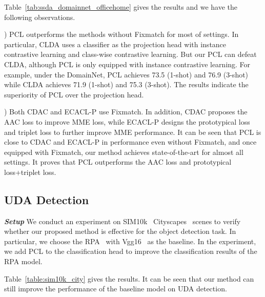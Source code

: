 Table~\ref{tab:ssda_domainnet_officehome} gives the results and we have the following observations.

) PCL outperforms the methods without Fixmatch for most of settings. In particular, CLDA uses a classifier as the projection head with instance contrastive learning and class-wise contrastive learning. But our PCL can defeat CLDA, although PCL is only equipped with instance contrastive learning. For example, under the DomainNet, PCL achieves 73.5 (1-shot) and 76.9 (3-shot) while CLDA achieves 71.9 (1-shot) and 75.3 (3-shot). The results indicate the superiority of PCL over the projection head.

) Both CDAC and ECACL-P use Fixmatch. In addition, CDAC proposes the AAC loss to improve MME loss, while ECACL-P designs the prototypical loss and triplet loss to further improve MME performance. It can be seen that PCL is close to CDAC and ECACL-P in performance even without Fixmatch, and once equipped with Fixmatch, our method achieves state-of-the-art for almost all settings. It proves that PCL outperforms the AAC loss and prototypical loss+triplet loss.


\subsection{UDA  Detection}
\label{app:DAOD}
\noindent\textbf{\textit{Setup}} We conduct an experiment on SIM10k~\cite{SIM10K}  Cityscapes~\cite{cordts2016cityscapes} scenes to verify whether our proposed method is effective for the object detection task.
In particular, we choose the RPA~\cite{zhang2021rpn} with Vgg16~\cite{simonyan2014very} as the baseline. In the experiment, we add PCL to the classification head to improve the classification results of the RPA model. 

Table~\ref{table:sim10k_city} gives the results. It can be seen that our method can still improve the performance of the baseline model on UDA detection.

\begin{table}

\centering
\renewcommand{\arraystretch}{1.1}
    \vspace{0.3 mm}
    \caption{Detection performance (\%) on UDA detection task.  means our reimplementation.}

\label{table:sim10k_city}
\end{table}










